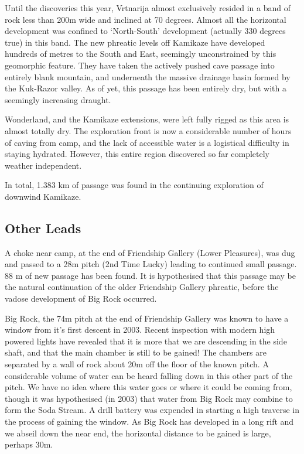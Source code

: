 Until the discoveries this year, Vrtnarija almost exclusively resided in
a band of rock less than 200m wide and inclined at 70 degrees. Almost
all the horizontal development was confined to `North-South' development
(actually 330 degrees true) in this band. The new phreatic levels off
Kamikaze have developed hundreds of metres to the South and East,
seemingly unconstrained by this geomorphic feature. They have taken the
actively pushed cave passage into entirely blank mountain, and
underneath the massive drainage basin formed by the Kuk-Razor valley. As
of yet, this passage has been entirely dry, but with a seemingly
increasing draught.

Wonderland, and the Kamikaze extensions, were left fully rigged as this
area is almost totally dry. The exploration front is now a considerable
number of hours of caving from camp, and the lack of accessible water is
a logistical difficulty in staying hydrated. However, this entire region
discovered so far completely weather independent.

In total, 1.383 km of passage was found in the continuing exploration of
downwind Kamikaze.

\hypertarget{other-leads}{%
\subsection{Other Leads}\label{other-leads}}

A choke near camp, at the end of Friendship Gallery (Lower Pleasures),
was dug and passed to a 28m pitch (2nd Time Lucky) leading to continued
small passage. 88 m of new passage has been found. It is hypothesised
that this passage may be the natural continuation of the older
Friendship Gallery phreatic, before the vadose development of Big Rock
occurred.

Big Rock, the 74m pitch at the end of Friendship Gallery was known to
have a window from it's first descent in 2003. Recent inspection with
modern high powered lights have revealed that it is more that we are
descending in the side shaft, and that the main chamber is still to be
gained! The chambers are separated by a wall of rock about 20m off the
floor of the known pitch. A considerable volume of water can be heard
falling down in this other part of the pitch. We have no idea where this
water goes or where it could be coming from, though it was hypothesised
(in 2003) that water from Big Rock may combine to form the Soda Stream.
A drill battery was expended in starting a high traverse in the process
of gaining the window. As Big Rock has developed in a long rift and we
abseil down the near end, the horizontal distance to be gained is large,
perhaps 30m.

